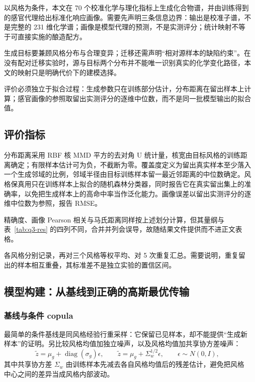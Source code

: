 \documentclass[UTF8,a4paper,zihao=-4]{ctexart}
\numberwithin{figure}{section}
\numberwithin{table}{section}
\numberwithin{equation}{section}
\begin{document}
以风格为条件，本文在 70 个校准化学与理化指标上生成化合物谱，并由训练得到的感官代理给出标准化响应画像。需要先声明三条信息边界：输出是校准子谱，不是完整的 231 维化学谱；画像是模型代理的预测，不是实测评分；统计映射不等于可直接实施的酿造配方。

生成目标要兼顾风格分布与合理变异；迁移还需声明“相对源样本的缺陷约束”。在没有配对迁移实验时，源与目标两个分布并不能唯一识别真实的化学变化路径，本文的映射只是明确代价下的建模选择。

评价必须独立于拟合过程：生成参数只在训练部分估计，分布距离在留出样本上计算；感官画像的参照取留出实测评分的逐维中位数，而不是同一批模型输出的拟合值。

\subsection{评价指标}

分布距离采用 RBF 核 MMD 平方的去对角 U 统计量，核宽由目标风格的训练距离确定；有限样本估计可为负，不截断为零。覆盖度定义为留出真实样本至少落入一个生成邻域的比例，邻域半径由目标训练样本留一最近邻距离的中位数确定。风格保真用只在训练样本上拟合的随机森林分类器，同时报告它在真实留出集上的准确率，以免把生成样本上的高命中率当作泛化能力。画像误差以留出实测评分的逐维中位数为参照，报告 RMSE。

精确度、画像 Pearson 相关与马氏距离同样按上述划分计算，但其量纲与表~\ref{tab:q3-res} 的四列不同，合并并列会误导，故随结果文件提供而不进正文表格。

各风格分别记录，再对三个风格等权平均、对 5 次重复汇总。需要说明，重复留出的样本相互重叠，其标准差不是独立实验的置信区间。

\subsection{模型构建：从基线到正确的高斯最优传输}

\subsubsection{基线与条件 copula}

最简单的条件基线是同风格经验行重采样：它保留已见样本，却不能提供“生成新样本”的证明。另比较风格均值加独立噪声，以及风格均值加共享协方差噪声：
\begin{equation}
\tilde z=\mu_g+\operatorname{diag}(\sigma_g)\epsilon,\qquad
\tilde z=\mu_g+\Sigma_w^{1/2}\epsilon,\qquad \epsilon\sim N(0,I),
\label{eq:noise-baseline}
\end{equation}
其中共享协方差 $\Sigma_w$ 由训练样本先减去各自风格均值后的残差估计，避免把风格中心之间的差异当成风格内部波动。
\end{document}
